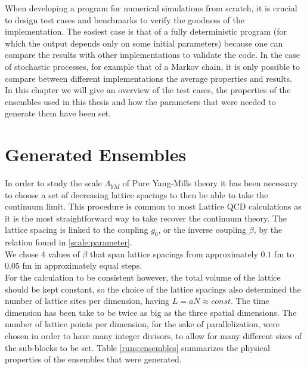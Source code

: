 When developing a program for numerical simulations from scratch, it is crucial to design test cases and benchmarks to verify the goodness of the implementation. The easiest case is that of a fully deterministic program (for which the output depends only on some initial parameters) because one can compare the results with other implementations to validate the code. In the case of stochastic processes, for example that of a Markov chain, it is only possible to compare between different implementations the average properties and results. \\
In this chapter we will give an overview of the test cases, the properties of the ensembles used in this thesis and how the parameters that were needed to generate them have been set.

\section{Generated Ensembles}
In order to study the scale $\Lambda_{YM}$ of Pure Yang-Mills theory it has been necessary to choose a set of decreasing lattice spacings to then be able to take the continuum limit. This procedure is common to most Lattice QCD calculations as it is the most straightforward way to take recover the continuum theory. The lattice spacing is linked to the coupling $g_0$, or the inverse coupling $\beta$, by the relation found in \cref{scale:parameter}.\\ 
We chose 4 values of $\beta$ that span lattice spacings from approximately $0.1$ fm to $0.05$ fm in approximately equal steps. \\
For the calculation to be consistent however, the total volume of the lattice should be kept constant, so the choice of the lattice spacings also determined the number of lattice sites per dimension, having $L = aN\approx const$. The time dimension has been take to be twice as big as the three spatial dimensions. The number of lattice points per dimension, for the sake of parallelization, were chosen in order to have many integer divisors, to allow for many different sizes of the sub-blocks to be set. Table \cref{runs:ensembles} summarizes the physical properties of the ensembles that were generated.

